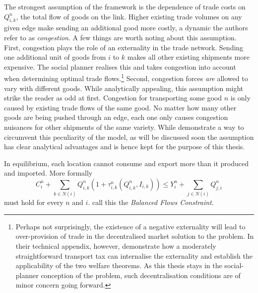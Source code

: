 \documentclass[11pt, oneside]{article}   	%
\begin{document}
The strongest assumption of the \citeauthor{fajgelbaum_optimal_2017} framework is the dependence of trade costs on $Q_{i,k}^{n}$, the total flow of goods on the link. Higher existing trade volumes on any given edge make sending an additional good more costly, a dynamic the authors refer to as \emph{congestion}. A few things are worth noting about this assumption. First, congestion plays the role of an externality in the trade network. Sending one additional unit of goods from $i$ to $k$ makes all other existing shipments more expensive. The social planner realises this and takes congestion into account when determining optimal trade flows.\footnote{Perhaps not surprisingly, the existence of a negative externality will lead to over-provision of trade in the decentralised market solution to the problem. In their technical appendix, however, \citeauthor{fajgelbaum_optimal_2017} demonstrate how a moderately straightforward transport tax can internalise the externality and establish the applicability of the two welfare theorems. As this thesis stays in the social-planner conception of the problem, such decentralisation conditions are of minor concern going forward.} Second, congestion forces \emph{are} allowed to vary with different goods. While analytically appealing, this assumption might strike the reader as odd at first. Congestion for transporting some good $n$ is only caused by existing trade flows of the same good. No matter how many other goods are being pushed through an edge, each one only causes congestion nuisances for other shipments of the same variety. While \citeauthor{fajgelbaum_optimal_2017} demonstrate a way to circumvent this peculiarity of the model, as will be discussed soon the assumption has clear analytical advantages and is hence kept for the purpose of this thesis.

In equilibrium, each location cannot consume and export more than it produced and imported. More formally
\begin{equation}
  C_{i}^{n} + \sum_{k\in N(i)}^{}Q_{i,k}^{n}(1+\tau_{i,k}^{n}(Q_{i,k}^{n}, I_{i,k})) \leq Y_{i}^{n} + \sum_{j\in N(i)}^{}Q_{j,i}^{n}
  \label{eq:balanced_flows}
\end{equation}
must hold for every $n$ and $i$. \citeauthor{fajgelbaum_optimal_2017} call this the \emph{Balanced Flows Constraint}.
\end{document}
